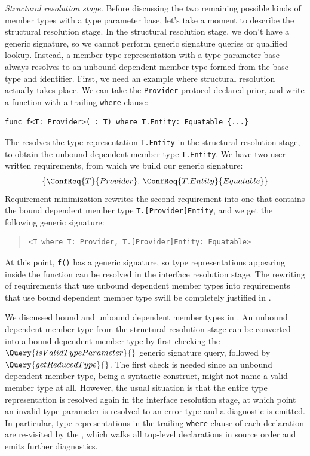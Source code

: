 \documentclass[../generics]{subfiles}
\begin{document}
\emph{Structural resolution stage.} Before discussing the two remaining possible kinds of member types with a type parameter base, let's take a moment to describe the structural resolution stage. In the structural resolution stage, we don't have a generic signature, so we cannot perform generic signature queries or qualified lookup. Instead, a member type representation with a type parameter base always resolves to an unbound dependent member type formed from the base type and identifier. First, we need an example where structural resolution actually takes place. We can take the \texttt{Provider} protocol declared prior, and write a function with a trailing \texttt{where} clause:
\begin{Verbatim}
func f<T: Provider>(_: T) where T.Entity: Equatable {...}
\end{Verbatim}
The  resolves the type representation \texttt{T.Entity} in the structural resolution stage, to obtain the unbound dependent member type \texttt{T.Entity}. We have two user-written requirements, from which we build our generic signature:
\[\{\ConfReq{T}{Provider},\,\ConfReq{T.Entity}{Equatable}\}\]
Requirement minimization rewrites the second requirement into one that contains the bound dependent member type \texttt{T.[Provider]Entity}, and we get the following generic signature:
\begin{quote}
\begin{verbatim}
<T where T: Provider, T.[Provider]Entity: Equatable>
\end{verbatim}
\end{quote}
At this point, \texttt{f()} has a generic signature, so type representations appearing inside the function can be resolved in the interface resolution stage. The rewriting of requirements that use unbound dependent member types into requirements that use bound dependent member type swill be completely justified in .

We discussed bound and unbound dependent member types in . An unbound dependent member type from the structural resolution stage can be converted into a bound dependent member type by first checking the 
$\Query{isValidTypeParameter}{}$ generic signature query, followed by $\Query{getReducedType}{}$. The first check is needed since an unbound dependent member type, being a syntactic construct, might not name a valid member type at all. However, the usual situation is that the entire type representation is resolved again in the interface resolution stage, at which point an invalid type parameter is resolved to an error type and a diagnostic is emitted. In particular, type representations in the trailing \texttt{where} clause of each declaration are re-visited by the , which walks all top-level declarations in source order and emits further diagnostics.
\end{document}

